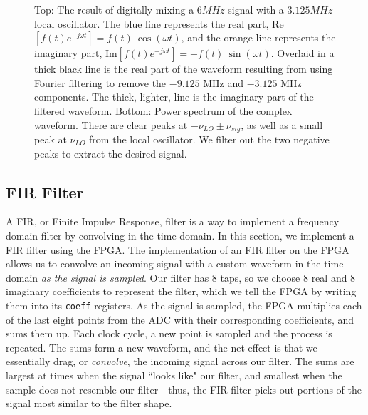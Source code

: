 \documentclass[12pt]{article}
\begin{document}
\begin{figure}[H]
\caption[SODUMB]{Top: The result of digitally mixing a $6 MHz$ signal with a $3.125 MHz$ local oscillator. The blue line represents the real part, Re${[f(t)e^{-j\omega t}]} = f(t)\ \cos(\omega t)$, and the orange line represents the imaginary part, Im${[f(t)e^{-j\omega t}]} = -f(t)\ \sin(\omega t)$. Overlaid in a thick black line is the real part of the waveform resulting from using Fourier filtering to remove the $-9.125$ MHz and $-3.125$ MHz components. The thick, lighter, line is the imaginary part of the filtered waveform. Bottom: Power spectrum of the complex waveform. There are clear peaks at $-\nu_{LO} \pm \nu_{sig}$, as well as a small peak at $\nu_{LO}$ from the local oscillator. We filter out the two negative peaks to extract the desired signal.}
\label{fig:ssb}
\end{figure}

\subsection{FIR Filter}
A FIR, or Finite Impulse Response, filter is a way to implement a frequency domain filter by convolving in the time domain. In this section, we implement a FIR filter using the FPGA. The implementation of an FIR filter on the FPGA allows us to convolve an incoming signal with a custom waveform in the time domain \textit{as the signal is sampled}. Our filter has 8 taps, so we choose 8 real and 8 imaginary coefficients to represent the filter, which we tell the FPGA by writing them into its \texttt{coeff} registers. As the signal is sampled, the FPGA multiplies each of the last eight points from the ADC with their corresponding coefficients, and sums them up. Each clock cycle, a new point is sampled and the process is repeated. The sums form a new waveform, and the net effect is that we  essentially drag, or \textit{convolve}, the incoming signal across our filter. The sums are largest at times when the signal ``looks like" our filter, and smallest when the sample does not resemble our filter---thus, the FIR filter picks out portions of the signal most similar to the filter shape.
\end{document}
